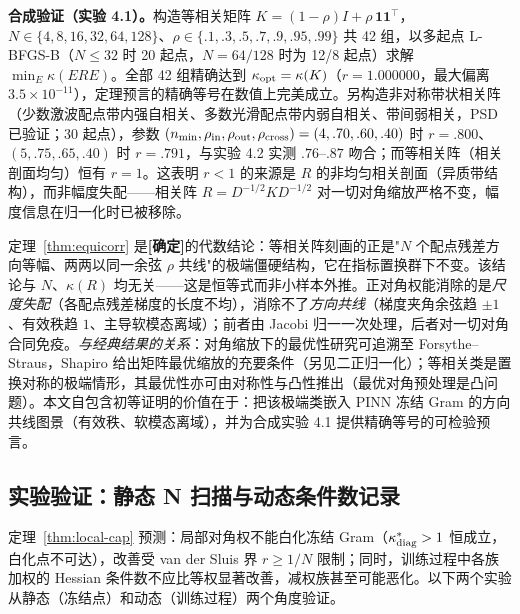 \documentclass[fontset=windows,11pt]{ctexart}
\numberwithin{equation}{section}
\begin{document}
\noindent\textbf{合成验证（实验 4.1）。}构造等相关矩阵 $K=(1-\rho)I+\rho\,\mathbf 1\mathbf 1^\top$，$N\in\{4,8,16,32,64,128\}$、$\rho\in\{.1,.3,.5,.7,.9,.95,.99\}$ 共 42 组，以多起点 L-BFGS-B（$N\le32$ 时 20 起点，$N=64/128$ 时为 12/8 起点）求解 $\min_E\kappa(ERE)$。全部 42 组精确达到 $\kappa_{\rm opt}=\kappa(K)$（$r=1.000000$，最大偏离 $3.5\times10^{-11}$），定理预言的精确等号在数值上完美成立。另构造非对称带状相关阵（少数激波配点带内强自相关、多数光滑配点带内弱自相关、带间弱相关，PSD 已验证；30 起点），参数 $(n_{\rm min},\rho_{\rm in},\rho_{\rm out},\rho_{\rm cross})=(4,.70,.60,.40)$ 时 $r=.800$、$(5,.75,.65,.40)$ 时 $r=.791$，与实验 4.2 实测 $.76$--$.87$ 吻合；而等相关阵（相关剖面均匀）恒有 $r=1$。这表明 $r<1$ 的来源是 $R$ 的非均匀相关剖面（异质带结构），而非幅度失配——相关阵 $R=D^{-1/2}KD^{-1/2}$ 对一切对角缩放严格不变，幅度信息在归一化时已被移除。

\noindent 定理~\ref{thm:equicorr} 是\textbf{[确定]}的代数结论：等相关阵刻画的正是"$N$ 个配点残差方向等幅、两两以同一余弦 $\rho$ 共线"的极端僵硬结构，它在指标置换群下不变。该结论与 $N$、$\kappa(R)$ 均无关——这是恒等式而非小样本外推。正对角权能消除的是\emph{尺度失配}（各配点残差梯度的长度不均），消除不了\emph{方向共线}（梯度夹角余弦趋 $\pm1$、有效秩趋 $1$、主导软模态离域）；前者由 Jacobi 归一一次处理，后者对一切对角合同免疫。\emph{与经典结果的关系}：对角缩放下的最优性研究可追溯至 Forsythe--Straus\cite{ForsytheStraus1955}，Shapiro\cite{Shapiro1982} 给出矩阵最优缩放的充要条件（另见二正归一化\cite{LivneGolub2004}）；等相关类是置换对称的极端情形，其最优性亦可由对称性与凸性推出（最优对角预处理是凸问题\cite{Qu2025ODP}）。本文自包含初等证明的价值在于：把该极端类嵌入 PINN 冻结 Gram 的方向共线图景（有效秩、软模态离域），并为合成实验 4.1 提供精确等号的可检验预言。

\subsection{实验验证：静态 N 扫描与动态条件数记录}\label{sec:R-exp}

定理~\ref{thm:local-cap} 预测：局部对角权不能白化冻结 Gram（$\kappa^*_{\rm diag}>1$ 恒成立，白化点不可达），改善受 van der Sluis 界 $r\ge1/N$ 限制；同时，训练过程中各族加权的 Hessian 条件数不应比等权显著改善，减权族甚至可能恶化。以下两个实验从静态（冻结点）和动态（训练过程）两个角度验证。
\end{document}
